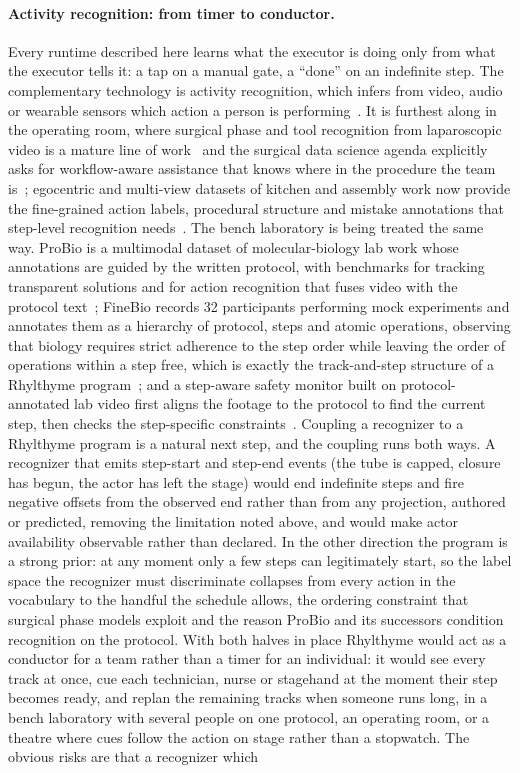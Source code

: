 \documentclass[10pt]{article}
\newcommand{\rt}{Rhylthyme}
\begin{document}
\paragraph{Activity recognition: from timer to conductor.} Every runtime described here learns what the executor is doing only from what the executor tells it: a tap on a manual gate, a ``done'' on an indefinite step. The complementary technology is activity recognition, which infers from video, audio or wearable sensors which action a person is performing~\cite{kong2022survey}. It is furthest along in the operating room, where surgical phase and tool recognition from laparoscopic video is a mature line of work~\cite{twinanda2017endonet} and the surgical data science agenda explicitly asks for workflow-aware assistance that knows where in the procedure the team is~\cite{maierhein2017sds}; egocentric and multi-view datasets of kitchen and assembly work now provide the fine-grained action labels, procedural structure and mistake annotations that step-level recognition needs~\cite{damen2018epic,grauman2022ego4d,sener2022assembly101}. The bench laboratory is being treated the same way. ProBio is a multimodal dataset of molecular-biology lab work whose annotations are guided by the written protocol, with benchmarks for tracking transparent solutions and for action recognition that fuses video with the protocol text~\cite{cui2023probio}; FineBio records 32 participants performing mock experiments and annotates them as a hierarchy of protocol, steps and atomic operations, observing that biology requires strict adherence to the step order while leaving the order of operations within a step free, which is exactly the track-and-step structure of a \rt{} program~\cite{yagi2025finebio}; and a step-aware safety monitor built on protocol-annotated lab video first aligns the footage to the protocol to find the current step, then checks the step-specific constraints~\cite{xu2026labsafety}. Coupling a recognizer to a \rt{} program is a natural next step, and the coupling runs both ways. A recognizer that emits step-start and step-end events (the tube is capped, closure has begun, the actor has left the stage) would end indefinite steps and fire negative offsets from the observed end rather than from any projection, authored or predicted, removing the limitation noted above, and would make actor availability observable rather than declared. In the other direction the program is a strong prior: at any moment only a few steps can legitimately start, so the label space the recognizer must discriminate collapses from every action in the vocabulary to the handful the schedule allows, the ordering constraint that surgical phase models exploit and the reason ProBio and its successors condition recognition on the protocol. With both halves in place \rt{} would act as a conductor for a team rather than a timer for an individual: it would see every track at once, cue each technician, nurse or stagehand at the moment their step becomes ready, and replan the remaining tracks when someone runs long, in a bench laboratory with several people on one protocol, an operating room, or a theatre where cues follow the action on stage rather than a stopwatch. The obvious risks are that a recognizer which 
\end{document}

